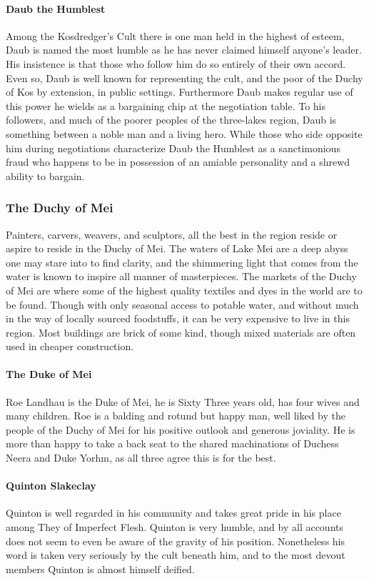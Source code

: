 \paragraph{Daub the Humblest}
Among the Kosdredger’s Cult there is one man held in the highest of esteem, Daub is named the most humble as he has never claimed himself anyone’s leader. His insistence is that those who follow him do so entirely of their own accord. Even so, Daub is well known for representing the cult, and the poor of the Duchy of Kos by extension, in public settings. Furthermore Daub makes regular use of this power he wields as a bargaining chip at the negotiation table. To his followers, and much of the poorer peoples of the three-lakes region, Daub is something between a noble man and a living hero. While those who side opposite him during negotiations characterize Daub the Humblest as a sanctimonious fraud who happens to be in possession of an amiable personality and a shrewd ability to bargain.

\subsubsection{The Duchy of Mei}
Painters, carvers, weavers, and sculptors, all the best in the region reside or aspire to reside in the Duchy of Mei. The waters of Lake Mei are a deep abyss one may stare into to find clarity, and the shimmering light that comes from the water is known to inspire all manner of masterpieces. The markets of the Duchy of Mei are where some of the highest quality textiles and dyes in the world are to be found. Though with only seasonal access to potable water, and without much in the way of locally sourced foodstuffs, it can be very expensive to live in this region. Most buildings are brick of some kind, though mixed materials are often used in cheaper construction.

\paragraph{The Duke of Mei}
Roe Landhau is the Duke of Mei, he is Sixty Three years old, has four wives and many children. Roe is a balding and rotund but happy man, well liked by the people of the Duchy of Mei for his positive outlook and generous joviality. He is more than happy to take a back seat to the shared machinations of Duchess Neera and Duke Yorhm, as all three agree this is for the best.

\paragraph{Quinton Slakeclay}
Quinton is well regarded in his community and takes great pride in his place among They of Imperfect Flesh. Quinton is very humble, and by all accounts does not seem to even be aware of the gravity of his position. Nonetheless his word is taken very seriously by the cult beneath him, and to the most devout members Quinton is almost himself deified.

